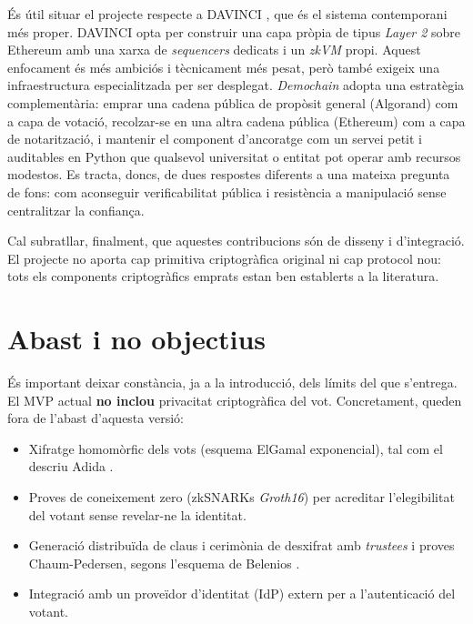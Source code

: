 És útil situar el projecte respecte a DAVINCI \cite{vocdoni2026davinci},
que és el sistema contemporani més proper. DAVINCI opta per construir
una capa pròpia de tipus \emph{Layer 2} sobre Ethereum amb una xarxa
de \emph{sequencers} dedicats i un \emph{zkVM} propi. Aquest enfocament
és més ambiciós i tècnicament més pesat, però també exigeix una
infraestructura especialitzada per ser desplegat. \emph{Demochain}
adopta una estratègia complementària: emprar una cadena pública de
propòsit general (Algorand) com a capa de votació, recolzar-se en una
altra cadena pública (Ethereum) com a capa de notarització, i mantenir
el component d'ancoratge com un servei petit i auditables en Python
que qualsevol universitat o entitat pot operar amb recursos modestos.
Es tracta, doncs, de dues respostes diferents a una mateixa pregunta
de fons: com aconseguir verificabilitat pública i resistència a
manipulació sense centralitzar la confiança.

Cal subratllar, finalment, que aquestes contribucions són de disseny i
d'integració. El projecte no aporta cap primitiva criptogràfica
original ni cap protocol nou: tots els components criptogràfics emprats
estan ben establerts a la literatura.

\section{Abast i no objectius}
\label{sec:abast}

És important deixar constància, ja a la introducció, dels límits del
que s'entrega. El \ac{MVP} actual \textbf{no inclou} privacitat
criptogràfica del vot. Concretament, queden fora de l'abast d'aquesta
versió:

\begin{itemize}
    \item Xifratge homomòrfic dels vots (esquema ElGamal exponencial), tal
    com el descriu Adida \cite{adida2008helios}.
    \item Proves de coneixement zero (\acsp{zkSNARK} \emph{Groth16}) per
    acreditar l'elegibilitat del votant sense revelar-ne la identitat.
    \item Generació distribuïda de claus i cerimònia de desxifrat amb
    \emph{trustees} i proves Chaum-Pedersen, segons l'esquema de
    Belenios \cite{cortier2019belenios}.
    \item Integració amb un proveïdor d'identitat (\ac{IdP}) extern per a
    l'autenticació del votant.
\end{itemize}

